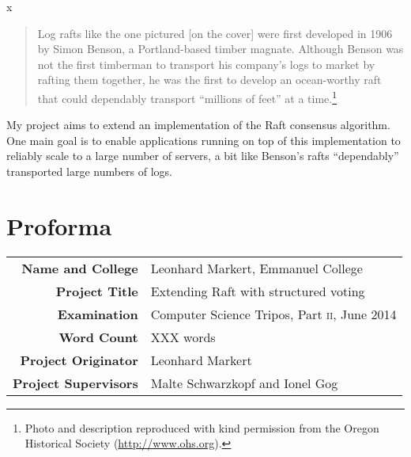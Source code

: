 \documentclass[12pt,chapterprefix=true,toc=bibliography,numbers=noendperiod,
               footnotes=multiple,twoside]{scrreprt}
\begin{document}



\begin{titlepage}


{\color{white}x}

\vfil

\begin{quote}
Log rafts like the one pictured [on the cover] were first developed in 1906 by Simon Benson, a Portland-based timber magnate. Although Benson was not the first timberman to transport his company's logs to market by rafting them together, he was the first to develop an ocean-worthy raft that could dependably transport \enquote{millions of feet} at a time.\footnote{Photo \parencite{benson} and description reproduced with kind permission from the Oregon Historical Society (\url{http://www.ohs.org}).}
\end{quote}

My project aims to extend an implementation of the Raft consensus algorithm. One main goal is to enable applications running on top of this implementation to reliably scale to a large number of servers, a bit like Benson's rafts \enquote{dependably} transported large numbers of logs.

\end{titlepage}

\chapter*{Proforma}
\label{ch:proforma}

\begin{center}
{\renewcommand{\arraystretch}{1.5}%
\begin{tabularx}{330pt}{rX}
\textbf{Name and College} & Leonhard Markert, Emmanuel College \\
\textbf{Project Title} & Extending Raft with structured voting \\
\textbf{Examination} & Computer Science Tripos, Part \textsc{ii}, June 2014 \\
\textbf{Word Count} & XXX words \\
\textbf{Project Originator} & Leonhard Markert \\
\textbf{Project Supervisors} & Malte Schwarzkopf and Ionel Gog
\end{tabularx}}
\end{center}
\end{document}
